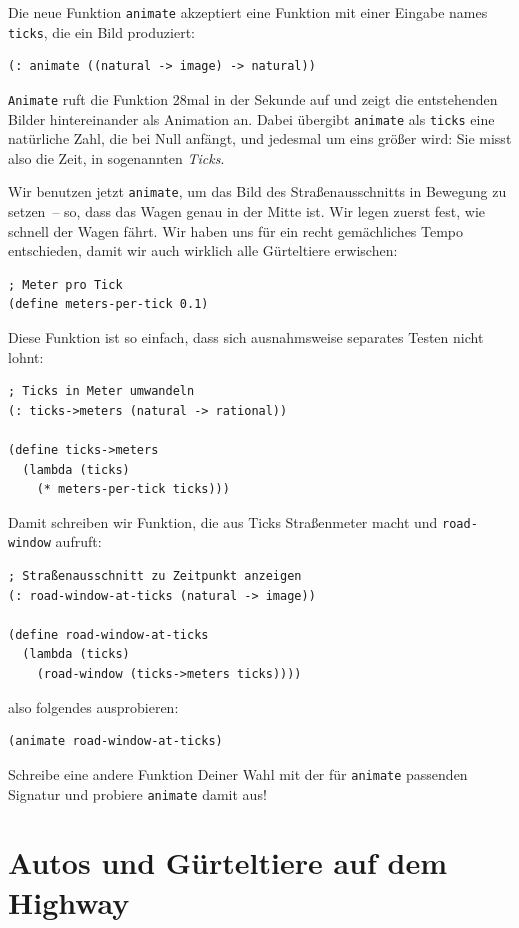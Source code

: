 Die neue Funktion \lstinline{animate} akzeptiert eine Funktion mit
einer Eingabe names \lstinline{ticks}, die ein Bild produziert:
%
\begin{lstlisting}
(: animate ((natural -> image) -> natural))
\end{lstlisting}
%
\lstinline{Animate} ruft die Funktion 28mal in der Sekunde auf und
zeigt die entstehenden Bilder hintereinander als Animation an.  Dabei
übergibt \lstinline{animate} als \lstinline{ticks} eine natürliche
Zahl, die bei Null anfängt, und jedesmal um eins größer wird: Sie
misst also die Zeit, in sogenannten \textit{Ticks}.

Wir benutzen jetzt \lstinline{animate}, um das Bild des
Straßenausschnitts in Bewegung zu setzen~-- so, dass das Wagen genau
in der Mitte ist.  Wir legen zuerst fest, wie schnell der Wagen fährt.
Wir haben uns für ein recht gemächliches Tempo entschieden, damit wir auch
wirklich alle Gürteltiere erwischen:
%
\begin{lstlisting}
; Meter pro Tick
(define meters-per-tick 0.1)
\end{lstlisting}
%
Diese Funktion ist so einfach, dass sich ausnahmsweise separates
Testen nicht lohnt:
%
\begin{lstlisting}
; Ticks in Meter umwandeln
(: ticks->meters (natural -> rational))

(define ticks->meters
  (lambda (ticks)
    (* meters-per-tick ticks)))
\end{lstlisting}
%
Damit schreiben wir Funktion, die aus Ticks Straßenmeter
macht und \lstinline{road-window} aufruft:
%
\begin{lstlisting}
; Straßenausschnitt zu Zeitpunkt anzeigen
(: road-window-at-ticks (natural -> image))

(define road-window-at-ticks
  (lambda (ticks)
    (road-window (ticks->meters ticks))))
\end{lstlisting}
also folgendes ausprobieren:
%
\begin{lstlisting}
(animate road-window-at-ticks)
\end{lstlisting}
%
\begin{aufgabeinline}
  Schreibe eine andere Funktion Deiner Wahl mit der für
  \lstinline{animate} passenden Signatur und probiere
  \lstinline{animate} damit aus!
\end{aufgabeinline}

\section{Autos und Gürteltiere auf dem Highway}

